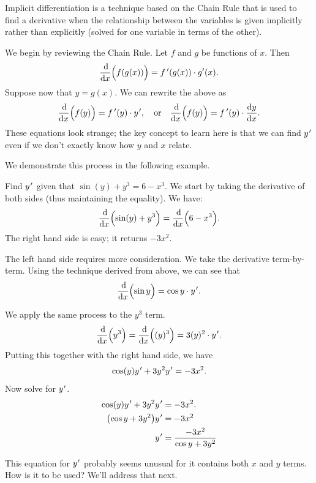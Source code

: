 Implicit differentiation is a technique based on the Chain Rule that is used to find a derivative when the relationship between the variables is given implicitly rather than explicitly (solved for one variable in terms of the other).\bigskip

We begin by reviewing the Chain Rule. Let $f$ and $g$ be functions of $x$. Then
\[\frac{\operatorname{d}\!}{\operatorname{d}\! x}\Bigl(f(g(x))\Bigr) = f\,'(g(x))\cdot g'(x).\]
Suppose now that $y=g(x)$. We can rewrite the above as
\begin{equation}
\frac{\dd}{\dd x}\Bigl(f(y)\Bigr) = \fp(y)\cdot y\primeskip', \quad \text{or}\quad
\frac{\dd}{\dd x}\Bigl(f(y)\Bigr) = \fp(y)\cdot \frac{\dd y}{\dd x} .\label{eq:implicit1}
\end{equation}
These equations look strange; the key concept to learn here is that we can find $y\primeskip'$ even if we don't exactly know how $y$ and $x$ relate.


We demonstrate this process in the following example.

\begin{example}\label{ex_implicit1}%
Find $y\primeskip'$ given that $\sin(y) + y^3=6-x^3$.
\solution
We start by taking the derivative of both sides (thus maintaining the equality). We have:
\[\frac{\operatorname{d}\!}{\operatorname{d}\! x}\Bigl(\sin(y) + y^3\Bigr)=\frac{\operatorname{d}\!}{\operatorname{d}\! x}\Bigl(6-x^3\Bigr).\]
The right hand side is easy; it returns $-3x^2$. 

The left hand side requires more consideration. We take the derivative term-by-term.  Using the technique derived from  above, we can see that
\vspace{-.3\baselineskip}
\[\frac{\dd}{\dd x}\Bigl(\sin y\Bigr) = \cos y \cdot y\primeskip'.\] %

We apply the same process to the $y^3$ term. 
\[
\frac{\dd}{\dd x}\Bigl(y^3\Bigr) = \frac{\dd}{\dd x}\Bigl((y)^3\Bigr) = 3(y)^2\cdot y\primeskip'.
\]
Putting this together with the right hand side, we have
\[\cos(y)y\primeskip'+3y^2y\primeskip' = -3x^2.\]
Now solve for $y\primeskip'$.\vspace{-.5\baselineskip}
\begin{align*}
	\cos(y)y\primeskip'+3y^2y\primeskip' 	&= -3x^2.\\
	\bigl(\cos y+3y^2\bigr)y\primeskip' &=	-3x^2\\
	y\primeskip'&=	\frac{-3x^2}{\cos y+3y^2}
\end{align*}

This equation for $y\primeskip'$ probably seems unusual for it contains both $x$ and $y$ terms. How is it to be used? We'll address that next.
\end{example}

